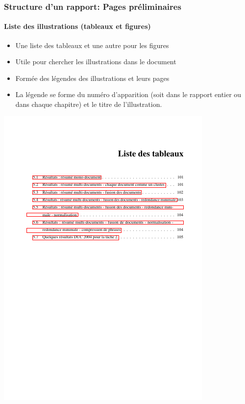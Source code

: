 \documentclass[xcolor=table]{beamer}
\begin{document}
\begin{frame}
\frametitle{Structure d'un rapport: Pages préliminaires}
\framesubtitle{Liste des illustrations (tableaux et figures)}

\begin{minipage}{0.60\textwidth}
	\begin{itemize}
		\item Une liste des tableaux et une autre pour les figures
		\item Utile pour chercher les illustrations dans le document
		\item Formée des légendes des illustrations et leurs pages
		\item La légende se forme du numéro d'apparition (soit dans le rapport entier ou dans chaque chapitre) et le titre de l'illustration.
	\end{itemize}
\end{minipage}
\begin{minipage}{0.38\textwidth}
	\includegraphics[width=\textwidth,frame]{..//img/Bweb03-redaction/table-lst.png}
\end{minipage}

\end{frame}
\end{document}
